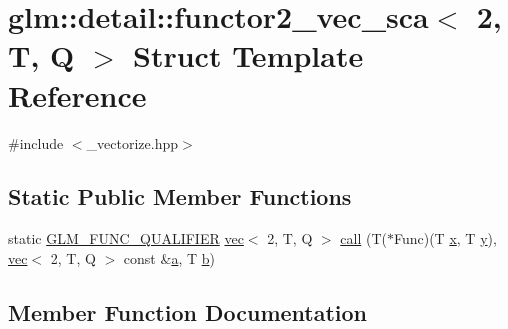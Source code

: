 \hypertarget{structglm_1_1detail_1_1functor2__vec__sca_3_012_00_01_t_00_01_q_01_4}{}\section{glm\+:\+:detail\+:\+:functor2\+\_\+vec\+\_\+sca$<$ 2, T, Q $>$ Struct Template Reference}
\label{structglm_1_1detail_1_1functor2__vec__sca_3_012_00_01_t_00_01_q_01_4}


{\ttfamily \#include $<$\+\_\+vectorize.\+hpp$>$}

\subsection*{Static Public Member Functions}
\begin{DoxyCompactItemize}
\item 
static \hyperlink{setup_8hpp_a33fdea6f91c5f834105f7415e2a64407}{G\+L\+M\+\_\+\+F\+U\+N\+C\+\_\+\+Q\+U\+A\+L\+I\+F\+I\+ER} \hyperlink{structglm_1_1vec}{vec}$<$ 2, T, Q $>$ \hyperlink{structglm_1_1detail_1_1functor2__vec__sca_3_012_00_01_t_00_01_q_01_4_a706cc99a668c874d6aef44ea579d2901}{call} (T($\ast$Func)(T \hyperlink{_s_d_l__opengl_8h_ad0e63d0edcdbd3d79554076bf309fd47}{x}, T \hyperlink{_s_d_l__opengl_8h_a1675d9d7bb68e1657ff028643b4037e3}{y}), \hyperlink{structglm_1_1vec}{vec}$<$ 2, T, Q $>$ const \&\hyperlink{_s_d_l__opengl__glext_8h_a3309789fc188587d666cda5ece79cf82}{a}, T \hyperlink{_s_d_l__opengl__glext_8h_a0f71581a41fd2264c8944126dabbd010}{b})
\end{DoxyCompactItemize}


\subsection{Member Function Documentation}
\mbox{\label{structglm_1_1detail_1_1functor2__vec__sca_3_012_00_01_t_00_01_q_01_4_a706cc99a668c874d6aef44ea579d2901}} 
